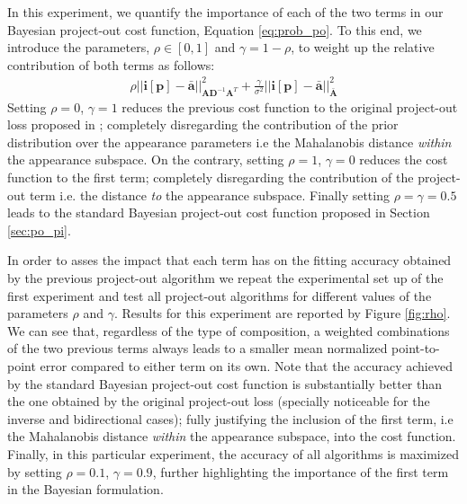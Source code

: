 In this experiment, we quantify the importance of each of the two terms in our Bayesian project-out cost function, Equation \ref{eq:prob_po}. To this end, we introduce the parameters, $\rho \in [0, 1]$ and $\gamma = 1 - \rho$, to weight up the relative contribution of both terms as follows:
\begin{equation}
    \begin{aligned}
        \rho|| \mathbf{i}[\mathbf{p}] - \mathbf{\bar{a}} ||^2_{\mathbf{A}\mathbf{D}^{-1}\mathbf{A}^T} 
        + 
        \frac{\gamma}{\sigma^2}|| \mathbf{i}[\mathbf{p}] - \mathbf{\bar{a}} ||^2_{\bar{\mathbf{A}}}
    \end{aligned}
    \label{eq:weighted_po}
\end{equation}
Setting $\rho=0$, $\gamma=1$ reduces the previous cost function to the original project-out loss proposed in \cite{Matthews2004}; completely disregarding the contribution of the prior distribution over the appearance parameters i.e the Mahalanobis distance \emph{within} the appearance subspace. On the contrary, setting $\rho=1$, $\gamma=0$ reduces the cost function to the first term; completely disregarding the contribution of the project-out term i.e. the distance \emph{to} the appearance subspace. Finally setting $\rho=\gamma=0.5$ leads to the standard Bayesian project-out cost function proposed in Section \ref{sec:po_pi}.
 
In order to asses the impact that each term has on the fitting accuracy obtained by the previous project-out algorithm we repeat the experimental set up of the first experiment and test all project-out algorithms for different values of the parameters $\rho$ and $\gamma$. Results for this experiment are reported by Figure \ref{fig:rho}. We can see that, regardless of the type of composition, a weighted combinations of the two previous terms always leads to a smaller mean normalized point-to-point error compared to either term on its own. Note that the accuracy achieved by the standard Bayesian project-out cost function is substantially better than the one obtained by the original project-out loss (specially noticeable for the inverse and bidirectional cases); fully justifying the inclusion of the first term, i.e the Mahalanobis distance \emph{within} the appearance subspace, into the cost function. Finally, in this particular experiment, the accuracy of all algorithms is maximized by setting $\rho=0.1$, $\gamma=0.9$, further highlighting the importance of the first term in the Bayesian formulation.

